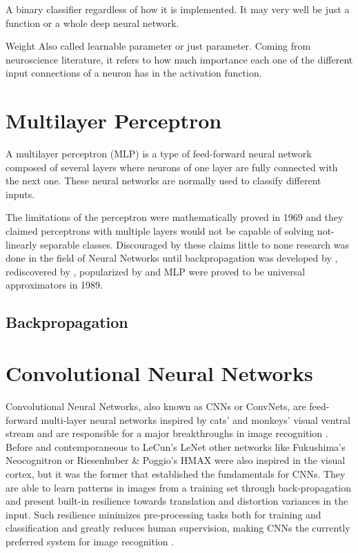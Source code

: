A binary classifier regardless of how it is implemented. It may very well be just a function or a whole deep neural network.

Weight
Also called learnable parameter or just parameter.
Coming from neuroscience literature, it refers to how much importance each one of the different input connections of a neuron has in the activation function.
\todo[inline]



\section{Multilayer Perceptron}
\label{sec:concepts:mlp}
A multilayer perceptron (MLP) is a type of feed-forward neural network composed of several layers where neurons of one layer are fully connected with the next one.
These neural networks are normally used to classify different inputs.

The limitations of the perceptron were mathematically proved \citet{Minsky1969} in 1969 and they claimed perceptrons with multiple layers would not be capable of solving not-linearly separable classes.
Discouraged by these claims little to none research was done in the field of Neural Networks until backpropagation was developed by \citet{Werbos1974}, rediscovered by \citet{Parker1985}, popularized by \citet{Rumelhart1988} and MLP were proved to be universal approximators \cite{Hornik1989,Ruck1990} in 1989.


\subsection{Backpropagation}
\label{sec:concepts:mlp:backpropagation}
\todo[inline]



\section{Convolutional Neural Networks}
\label{sec:concepts:convnets}
Convolutional Neural Networks, also known as CNNs or ConvNets, are feed-forward multi-layer neural networks inspired by cats' and monkeys' visual ventral stream \cite{Hubel1968,Lawrence1997} and are responsible for a major breakthroughs in image recognition \cite{LeCun1995}.
Before and contemporaneous to LeCun's LeNet \cite{LeCun1998} other networks like Fukushima's Neocognitron \cite{Fukushima1980} or Riesenhuber \& Poggio's HMAX \cite{Riesenhuber1999} were also inspired in the visual cortex, but it was the former that established the fundamentals for CNNs.
They are able to learn patterns in images from a training set through back-propagation and present built-in resilience towards translation and distortion variances in the input.
Such resilience minimizes pre-processing tasks both for training and classification and greatly reduces human supervision, making CNNs the currently preferred system for image recognition \cite{Visin2015}.

